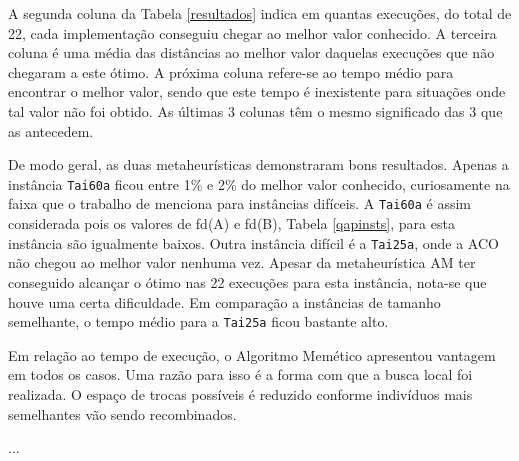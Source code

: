 A segunda coluna da Tabela \ref{resultados} indica em quantas
execuções, do total de 22, cada implementação conseguiu chegar ao
melhor valor conhecido. A terceira coluna é uma média das distâncias
ao melhor valor daquelas execuções que não chegaram a este ótimo. A
próxima coluna refere-se ao tempo médio para encontrar o melhor valor,
sendo que este tempo é inexistente para situações onde tal valor não
foi obtido. As últimas 3 colunas têm o mesmo significado das 3 que as
antecedem.

De modo geral, as duas metaheurísticas demonstraram bons
resultados. Apenas a instância \verb!Tai60a! ficou entre 1\% e 2\% do
melhor valor conhecido, curiosamente na faixa que o trabalho de
\cite{taillard1} menciona para instâncias difíceis. A \verb!Tai60a! é
assim considerada pois os valores de fd(A) e fd(B), Tabela
\ref{qapinsts}, para esta instância são igualmente baixos.
Outra instância difícil é a \verb!Tai25a!, onde a ACO não chegou ao
melhor valor nenhuma vez. Apesar da metaheurística AM ter conseguido
alcançar o ótimo nas 22 execuções para esta instância, nota-se que
houve uma certa dificuldade. Em comparação a instâncias de tamanho
semelhante, o tempo médio para a \verb!Tai25a! ficou bastante alto.

Em relação ao tempo de execução, o Algoritmo Memético apresentou
vantagem em todos os casos. Uma razão para isso é a forma com que a
busca local foi realizada. O espaço de trocas possíveis é reduzido
conforme indivíduos mais semelhantes vão sendo recombinados.

...
